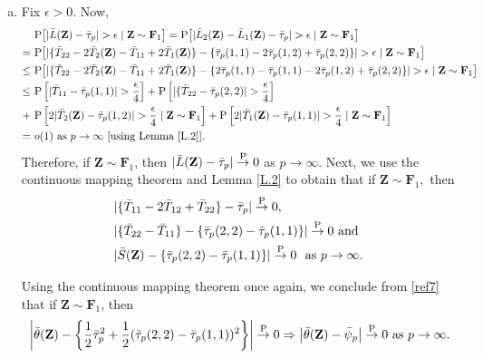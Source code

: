 \documentclass[twoside]{article}
\newcommand{\bZ}{\mathbf{Z}}
\newcommand{\bF}{\mathbf{F}}
\newcommand{\0}{\mathbf{0}}
\newcommand{\1}{\mathbf{1}}
\numberwithin{equation}{section}
\begin{document}
\begin{enumerate}[(a)]
 \item Fix $\epsilon >0.$ Now,
\begin{align}\label{ref4}
 &\ {\rm P}\big [|\bar{L}(\bZ) - \bar{\tau}_p|>\epsilon\mid \bZ\sim\bF_1\big ]= {\rm P}\big [|\bar{L}_2(\bZ)- \bar{L}_1(\bZ) - \bar{\tau}_p|>\epsilon\mid \bZ\sim\bF_1\big ]\nonumber \\
 =&\ {\rm P}\big [|\{\bar{T}_{22} - 2\bar{T}_2(\bZ)- \bar{T}_{11} + 2\bar{T}_1(\bZ)\}
 - \{\bar{\tau}_p(1,1) - 2\bar{\tau}_p(1,2) +\bar{\tau}_p(2,2)\}|>\epsilon\mid \bZ\sim\bF_1\big ]\nonumber \\
 \leq &\ {\rm P}\big [|\{\bar{T}_{22} - 2\bar{T}_2(\bZ)- \bar{T}_{11} + 2\bar{T}_1(\bZ)\}- \{2\bar{\tau}_p(1,1) -\bar{\tau}_p(1,1) - 2\bar{\tau}_p(1,2) +\bar{\tau}_p(2,2)\}|>\epsilon\mid \bZ\sim\bF_1\big ]\nonumber \\
 \leq &\ {\rm P}\left [|\bar{T}_{11}-\bar{\tau}_p(1,1)|>\frac{\epsilon}{4}\right ] + {\rm P}\left [|\{\bar{T}_{22} - \bar{\tau}_p(2,2)|>\frac{\epsilon}{4}\right ]\nonumber \\
  +&\ {\rm P}\left [2|\bar{T}_2(\bZ)- \bar{\tau}_p(1,2)|>\frac{\epsilon}{4}\mid \bZ\sim\bF_1\right ]+ {\rm P}\left [2|\bar{T}_1(\bZ) - \bar{\tau}_p(1,1)|>\frac{\epsilon}{4}\mid \bZ\sim\bF_1\right ]\nonumber \\
 =&\ o(1)\text{ as }p\to\infty\ [\text{using Lemma \ref{L.2}}].
\end{align}
Therefore, if $\bZ\sim\bF_1$, then $|\bar{L}(\bZ) - \bar{\tau}_p|\stackrel{\rm P}{\to}0$ as $p\to\infty$. Next, we use the continuous mapping theorem and Lemma \ref{L.2} to obtain that if $\bZ\sim\bF_1,$ then
\begin{align*}
& |\{\bar{T}_{11}-2\bar{T}_{12}+\bar{T}_{22}\}- \bar{\tau}_p|\stackrel{\rm P}{\to}0,\\
& |\{\bar{T}_{22}-\bar{T}_{11}\}- \{\bar{\tau}_p(2,2)-\bar{\tau}_p(1,1)\}|\stackrel{\rm P}{\to}0\text{ and }\\
  & |\bar{S}(\bZ)-\{\bar{\tau}_p(2,2)-\bar{\tau}_p(1,1)\}|\stackrel{\rm P}{\to}0\ \text{ as }p\to\infty.
\end{align*}

Using the continuous mapping theorem once again, we conclude from \eqref{ref7} that if $\bZ\sim\bF_1$, then
\begin{align}\label{ref8}
 &\ \left |\bar{\theta}(\bZ) - \left \{\frac{1}{2}\bar{\tau}_p^2 + \frac{1}{2}(\bar{\tau}_p(2,2)-\bar{\tau}_p(1,1))^2\right \}\right |\stackrel{\rm P}{\to}0
 \Rightarrow  \left |\bar{\theta}(\bZ) - \bar{\psi}_p\right |\stackrel{\rm P}{\to}0\text{ as }p\to\infty.
\end{align}


\end{enumerate}
\end{document}
